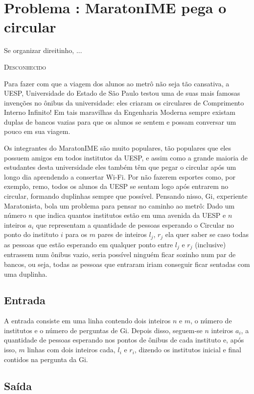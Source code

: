 \section*{Problema \proxLetra: MaratonIME pega o circular}

\epigraph{Se organizar direitinho, ...}{\textsc{Desconhecido}}

Para fazer com que a viagem dos alunos ao metrô não seja tão cansativa, a UESP, Universidade do Estado de São Paulo testou uma de suas mais famosas invenções no ônibus da universidade: eles criaram os circulares de Comprimento Interno Infinito! Em tais maravilhas da Engenharia Moderna sempre existam duplas de bancos vazias para que os alunos se sentem e possam conversar um pouco em sua viagem.
 
Os integrantes do MaratonIME são muito populares, tão populares que eles possuem amigos em todos institutos da UESP, e assim como a grande maioria de estudantes desta universidade eles também têm que pegar o circular após um longo dia aprendendo a consertar Wi-Fi. Por não fazerem esportes como, por exemplo, remo, todos os alunos da UESP se sentam logo após entrarem no circular, formando duplinhas sempre que possível. Pensando nisso, Gi, experiente Maratonista, bola um problema para pensar no caminho ao metrô: Dado um número $n$ que indica quantos institutos estão em uma avenida da UESP e $n$ inteiros $a_i$ que representam a quantidade de pessoas esperando o Circular no ponto do instituto $i$ para os $m$ pares de inteiros $l_j$, $r_j$ ela quer saber se caso todas as pessoas que estão esperando em qualquer ponto entre $l_j$ e $r_j$ (inclusive) entrassem num ônibus vazio, seria possível ninguém ficar sozinho num par de bancos, ou seja, todas as pessoas que entraram iriam conseguir ficar sentadas com uma duplinha.

\subsection*{Entrada}

A entrada consiste em uma linha contendo dois inteiros $n$ e $m$, o número de institutos e o número de perguntas de Gi. Depois disso, seguem-se $n$ inteiros $a_i$, a quantidade de pessoas esperando nos pontos de ônibus de cada instituto e, após isso, $m$ linhas com dois inteiros cada, $l_i$ e $r_i$, dizendo os institutos inicial e final contidos na pergunta da Gi.


\subsection*{Saída}

